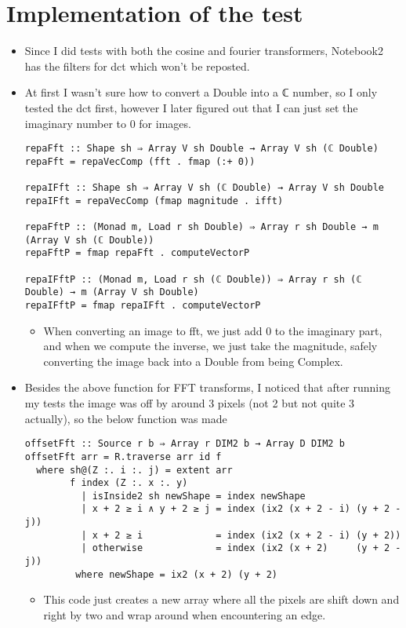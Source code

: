 \documentclass{article}
\begin{document}
\section{Implementation of the test}
\label{sec-2}
\begin{itemize}
\item Since Ι did tests with both the cosine and fourier transformers,
Notebook2 has the filters for dct which won't be reposted.
\item At first I wasn't sure how to convert a Double into a ℂ number, so I
only tested the dct first, however I later figured out that I can
just set the imaginary number to 0 for images.
\begin{verbatim}
repaFft :: Shape sh ⇒ Array V sh Double → Array V sh (ℂ Double)
repaFft = repaVecComp (fft . fmap (:+ 0))

repaIFft :: Shape sh ⇒ Array V sh (ℂ Double) → Array V sh Double
repaIFft = repaVecComp (fmap magnitude . ifft)

repaFftP :: (Monad m, Load r sh Double) ⇒ Array r sh Double → m (Array V sh (ℂ Double))
repaFftP = fmap repaFft . computeVectorP

repaIFftP :: (Monad m, Load r sh (ℂ Double)) ⇒ Array r sh (ℂ Double) → m (Array V sh Double)
repaIFftP = fmap repaIFft . computeVectorP
\end{verbatim}
\begin{itemize}
\item When converting an image to fft, we just add 0 to the imaginary
part, and when we compute the inverse, we just take the magnitude,
safely converting the image back into a Double from being Complex.
\end{itemize}

\item Besides the above function for FFT transforms, Ι noticed that after
running my tests the image was off by around 3 pixels (not 2 but not
quite 3 actually), so the below function was made
\begin{verbatim}
offsetFft :: Source r b ⇒ Array r DIM2 b → Array D DIM2 b
offsetFft arr = R.traverse arr id f
  where sh@(Z :. i :. j) = extent arr
        f index (Z :. x :. y)
          | isInside2 sh newShape = index newShape
          | x + 2 ≥ i ∧ y + 2 ≥ j = index (ix2 (x + 2 - i) (y + 2 - j))
          | x + 2 ≥ i             = index (ix2 (x + 2 - i) (y + 2))
          | otherwise             = index (ix2 (x + 2)     (y + 2 - j))
         where newShape = ix2 (x + 2) (y + 2)
\end{verbatim}
\begin{itemize}
\item This code just creates a new array where all the pixels are shift
down and right by two and wrap around when encountering an edge.


\end{itemize}
\end{itemize}
\end{document}
